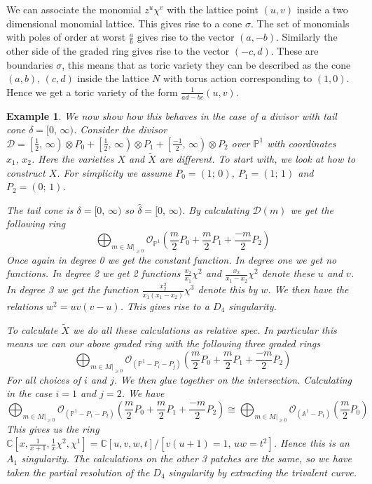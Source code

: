 \documentclass[11pt]{amsart}
\theoremstyle{plain}
\newtheorem{ex}[thm]{Example}
\newcommand{\mb}[1]{\mathbb{#1}}
\begin{document}
We can associate the monomial $z^u \chi^v$ with the lattice point $(u,v)$ inside a two dimensional monomial lattice. This gives rise to a cone $\sigma$. The set of monomials with poles of order at worst $\frac{a}{b}$ gives rise to the vector $(a, -b)$. Similarly the other side of the graded ring gives rise to the vector $(-c, d)$. These are boundaries $\sigma$, this means that as toric variety they can be described as the cone $(a,b)$, $(c,d)$ inside the lattice $N$ with torus action corresponding to $(1,0)$.  Hence we get a toric variety of the form $\frac{1}{ad-bc}(u,v)$.


\begin{ex}\rm
We now show how this behaves in the case of a divisor with tail cone $\delta = [0, \, \infty)$. Consider the divisor $\mathcal{D} = \left[\frac{1}{2}, \, \infty \right) \otimes P_0 + \left[\frac{1}{2}, \, \infty \right) \otimes P_1 + \left[\frac{-1}{2}, \, \infty \right) \otimes P_2$ over $\mb{P}^1$ with coordinates $x_1, \, x_2$. Here the varieties $X$ and $\widetilde{X}$ are different. To start with, we look at how to construct $X$. For simplicity we assume $P_0 = (1; \, 0)$, $P_1 = (1; \, 1)$ and $P_2 = (0; \, 1)$.

The tail cone is $\delta = [0, \, \infty)$ so $\hat\delta = [0, \, \infty)$. By calculating $\mathcal{D}(m)$ we get the following ring
\[
\bigoplus_{m \in M|_{\geq 0}} \mathcal{O}_{\mb{P}^1} \left( \frac{m}{2} P_0 + \frac{m}{2} P_1 + \frac{-m}{2} P_2 \right)
\]
Once again in degree 0 we get the constant function. In degree one we get no functions. In degree 2 we get 2 functions $\frac{x_2}{x_1} \chi^2 $ and $\frac{x_2}{x_1-x_2} \chi^2$ denote these $u$ and $v$. In degree 3 we get the function $\frac{x_2^2}{x_1(x_1-x_2)} \chi^3 $ denote this by $w$. We then have the relations $w^2 = uv(v-u)$. This gives rise to a $D_4$ singularity.  

To calculate $\widetilde{X}$ we do all these calculations as relative spec. In particular this means we can our above graded ring with the following three graded rings
\[
\bigoplus_{m \in M|_{\geq 0}} \mathcal{O}_{(\mb{P}^1 - P_i - P_j)} \left( \frac{m}{2} P_0 + \frac{m}{2} P_1 + \frac{-m}{2} P_2 \right)
\]
For all choices of $i$ and $j$. We then glue together on the intersection. Calculating in the case $i=1$ and $j =2$. We have
\[
\bigoplus_{m \in M|_{\geq 0}} \mathcal{O}_{(\mb{P}^1 - P_1 - P_2)} \left( \frac{m}{2} P_0 + \frac{m}{2} P_1 + \frac{-m}{2} P_2 \right) \cong \bigoplus_{m \in M|_{\geq 0}} \mathcal{O}_{(\mb{A}^1 - P_1)} (\frac{m}{2}P_0)
\]
This gives us the ring $\mb{C}[x, \frac{1}{x+1}, \frac{1}{x}\chi^2, \chi^1] = \mb{C}[u,v,w,t]/[v(u+1) = 1, \, uw = t^2]$. Hence this is an $A_1$ singularity. The calculations on the other 3 patches are the same, so we have taken the partial resolution of the $D_4$ singularity by extracting the trivalent curve. 
\end{ex}
\end{document}
